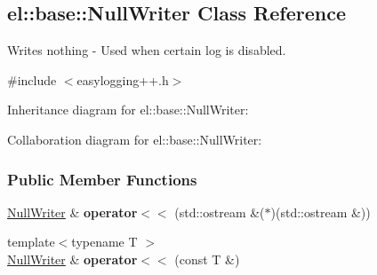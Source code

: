 \hypertarget{a00062}{}\subsection{el\+:\+:base\+:\+:Null\+Writer Class Reference}
\label{a00062}


Writes nothing -\/ Used when certain log is disabled.  




{\ttfamily \#include $<$easylogging++.\+h$>$}



Inheritance diagram for el\+:\+:base\+:\+:Null\+Writer\+:


Collaboration diagram for el\+:\+:base\+:\+:Null\+Writer\+:
\subsubsection*{Public Member Functions}
\begin{DoxyCompactItemize}
\item 
\hypertarget{a00062_a39cb7d47986d70c2b4e9d78d1482da7d}{}\hyperlink{a00062}{Null\+Writer} \& {\bfseries operator$<$$<$} (std\+::ostream \&($\ast$)(std\+::ostream \&))\label{a00062_a39cb7d47986d70c2b4e9d78d1482da7d}

\item 
\hypertarget{a00062_a57cb0f5d93ebac076b8ef94d6eff65a2}{}{\footnotesize template$<$typename T $>$ }\\\hyperlink{a00062}{Null\+Writer} \& {\bfseries operator$<$$<$} (const T \&)\label{a00062_a57cb0f5d93ebac076b8ef94d6eff65a2}

\end{DoxyCompactItemize}
